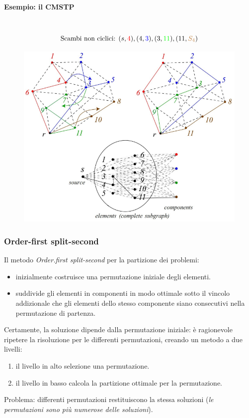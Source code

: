\documentclass{article}
\begin{document}
\paragraph{Esempio: il CMSTP}\mbox{}\\
$$\text{Scambi non ciclici: }(s,\begingroup\color{red}4\endgroup),(4,\begingroup\color{blue}3\endgroup),(3,\begingroup\color{green}11\endgroup),(11,\begingroup\color{brown}S_4\endgroup)$$
\begin{figure}[H]
    \centering
    \includegraphics[scale=0.55]{images/CMSTP_ex1.png}
\end{figure}

\subsubsection{Order-first split-second}
Il metodo \textit{Order.first split-second} per la partizione dei problemi:
\begin{itemize}
    \item inizialmente costruisce una permutazione iniziale degli elementi.
    \item suddivide gli elementi in componenti in modo ottimale sotto il vincolo addizionale che
    gli elementi dello stesso componente siano consecutivi nella permutazione di partenza.
\end{itemize}
Certamente, la soluzione dipende dalla permutazione iniziale: è ragionevole ripetere la risoluzione
per le differenti permutazioni, creando un metodo a due livelli:
\begin{enumerate}
    \item il livello in alto selezione una permutazione.
    \item il livello in basso calcola la partizione ottimale per la permutazione.
\end{enumerate}
Problema: differenti permutazioni restituiscono la stessa soluzioni (\textit{le permutazioni
sono più numerose delle soluzioni}).
\end{document}
